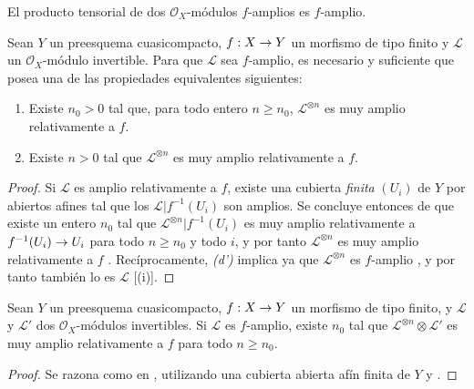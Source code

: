 \documentclass[oneside,10pt]{amsart}
\makeatletter
\renewcommand{\geq}{\geqslant}
\newcommand{\ega@arrow}[2]{\mathchoice{#1}{#2}{#2}{#2}}
\renewcommand{\to}{\ega@arrow{\longrightarrow}{\rightarrow}}
\let\EGAOriginalLabel\label
\renewcommand{\label}[1]{\phantomsection\EGAOriginalLabel{#1}}
\makeatother
\begin{document}
\begin{corollary}[4.6.10]
\label{II.4.6.10-fr}
El producto tensorial de dos $\mathcal{O}_X$-módulos $f$-amplios es $f$-amplio.
\end{corollary}

\begin{proposition}[4.6.11]
\label{II.4.6.11-fr}
Sean $Y$ un preesquema cuasicompacto, $f:X\to Y$ un morfismo de tipo finito y $\mathcal{L}$ un $\mathcal{O}_X$-módulo invertible.
Para que $\mathcal{L}$ sea $f$-amplio, es necesario y suficiente que posea una de las propiedades equivalentes siguientes:
\begin{enumerate}
  \item[\rm{(d)}] Existe $n_0>0$ tal que, para todo entero $n\geq n_0$, $\mathcal{L}^{\otimes n}$ es muy amplio relativamente a $f$.
  \item[\rm{(d')}] Existe $n>0$ tal que $\mathcal{L}^{\otimes n}$ es muy amplio relativamente a $f$.
\end{enumerate}
\end{proposition}

\begin{proof}
Si $\mathcal{L}$ es amplio relativamente a $f$, existe una cubierta \emph{finita} $(U_i)$ de $Y$ por abiertos afines tal que los $\mathcal{L}|f^{-1}(U_i)$ son amplios.
Se concluye entonces de  que existe un entero $n_0$ tal que $\mathcal{L}^{\otimes n}|f^{-1}(U_i)$ es muy amplio relativamente a $f^{-1}(U_i)\to U_i$ para todo $n\geq n_0$ y todo $i$, y por tanto $\mathcal{L}^{\otimes n}$ es muy amplio relativamente a $f$ .
Recíprocamente, \emph{(d')} implica ya que $\mathcal{L}^{\otimes n}$ es $f$-amplio , y por tanto también lo es $\mathcal{L}$ [(i)].
\end{proof}

\begin{corollary}[4.6.12]
\label{II.4.6.12-fr}
Sean $Y$ un preesquema cuasicompacto, $f:X\to Y$ un morfismo de tipo finito, y $\mathcal{L}$ y $\mathcal{L}'$ dos $\mathcal{O}_X$-módulos invertibles.
Si $\mathcal{L}$ es $f$-amplio, existe $n_0$ tal que $\mathcal{L}^{\otimes n}\otimes\mathcal{L}'$ es muy amplio relativamente a $f$ para todo $n\geq n_0$.
\end{corollary}

\begin{proof}
Se razona como en , utilizando una cubierta abierta afín finita de $Y$ y .
\end{proof}
\end{document}
